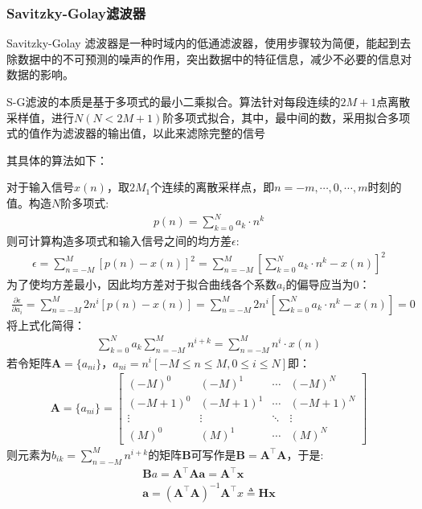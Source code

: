 \documentclass{ctexart}
\begin{document}
			\subsubsection{Savitzky-Golay滤波器}
				Savitzky-Golay 滤波器是一种时域内的低通滤波器，使用步骤较为简便，能起到去除数据中的不可预测的噪声的作用，突出数据中的特征信息，减少不必要的信息对数据的影响。\par
				S-G滤波的本质是基于多项式的最小二乘拟合。算法针对每段连续的$2M+1$点离散采样值，进行$N(N<2M+1)$阶多项式拟合，其中，最中间的数，采用拟合多项式的值作为滤波器的输出值，以此来滤除完整的信号\par
				其具体的算法如下：\par
				对于输入信号$x(n)$，取$2M_1$个连续的离散采样点，即$n=-m,\cdots,0,\cdots,m$时刻的值。构造$N$阶多项式:
				\begin{gather}
					p(n)=\sum_{k=0}^{N}a_k\cdot n^k
				\end{gather}
				则可计算构造多项式和输入信号之间的均方差$\epsilon$:
				\begin{gather}
					\epsilon=\sum_{n=-M}^{M}[p(n)-x(n)]^2=\sum_{n=-M}^{M}[\sum_{k=0}^{N}a_k\cdot n^k-x(n)]^2
				\end{gather}
				为了使均方差最小，因此均方差对于拟合曲线各个系数$a_i$的偏导应当为0：
				\begin{gather}
					\frac{\partial \epsilon}{\partial a_i}=\sum_{n=-M}^{M}2n^i[p(n)-x(n)]=\sum_{n=-M}^{M}2n^i[\sum_{k=0}^{N}a_k\cdot n^k-x(n)]=0
				\end{gather}
				将上式化简得：
				\begin{gather}
					\sum_{k=0}^{N}a_k\sum_{n=-M}^{M}n^{i+k}=\sum_{n=-M}^{M}n^i\cdot x(n)
				\end{gather}
				若令矩阵$\bm{A}=\{a_{ni}\}$，$a_{ni}=n^i[-M\leq n \leq M,0\leq i\leq N]$即：
				\begin{gather}
					\bm{A}=\{a_{ni}\} = 
					\begin{bmatrix}  
						(-M)^0 & (-M)^1 & \cdots & (-M)^N \\  
						(-M+1)^0 & (-M+1)^1 & \cdots & (-M+1)^N \\  
						\vdots & \vdots & \ddots & \vdots \\  
						(M)^0 & (M)^1 & \cdots & (M)^N  
					\end{bmatrix} 
				\end{gather}
				则元素为$b_{ik}=\sum_{n=-M}^{M}n^{i+k}$的矩阵$\bm{B}$可写作是$\bm{B}=\bm{A}^\top \bm{A}$，于是:
				\begin{gather}
					\bm{B}a=\bm{A}^\top \bm{A}\bm{a}=\bm{A}^\top \bm{x}\\
					\bm{a}=(\bm{A}^\top \bm{A})^{-1}\bm{A}^\top x\triangleq\bm{H}\bm{x}
				\end{gather}
\end{document}
